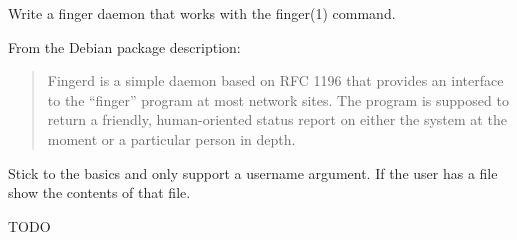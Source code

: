 \begin{Exercise}[title={*Finger daemon},difficulty=8]
\label{ex:finger}
\Question
Write a finger daemon that works with the finger(1) command. 

From the Debian package description:
\begin{quote}
Fingerd is a simple daemon based on RFC 1196 \cite{RFC1196} that provides an interface to the
``finger'' program at most network sites.  The program is supposed to return a
friendly, human-oriented status report on either the system at the moment or a
particular person in depth.
\end{quote}

Stick to the basics and only support a username argument. If the user has a  file
show the contents of that file.
\end{Exercise}

\begin{Answer}
\Question
TODO
\end{Answer}
